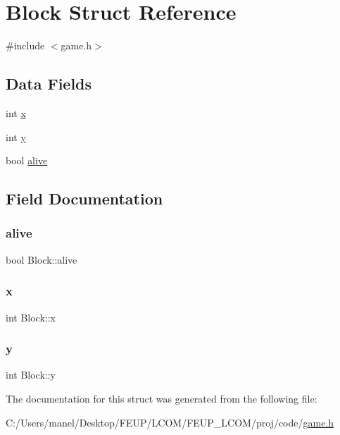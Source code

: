 \hypertarget{struct_block}{}\section{Block Struct Reference}
\label{struct_block}


{\ttfamily \#include $<$game.\+h$>$}

\subsection*{Data Fields}
\begin{DoxyCompactItemize}
\item 
int \mbox{\hyperlink{struct_block_a13d0a6d225233353862fa5adcbadf661}{x}}
\item 
int \mbox{\hyperlink{struct_block_a9328d6b6fcc9f9c019d091d87ceda41c}{y}}
\item 
bool \mbox{\hyperlink{struct_block_ace17e5300d4d90b70136387c91a830c5}{alive}}
\end{DoxyCompactItemize}


\subsection{Field Documentation}
\mbox{\label{struct_block_ace17e5300d4d90b70136387c91a830c5}} 
\subsubsection{\texorpdfstring{alive}{alive}}
{\footnotesize\ttfamily bool Block\+::alive}

\mbox{\label{struct_block_a13d0a6d225233353862fa5adcbadf661}} 
\subsubsection{\texorpdfstring{x}{x}}
{\footnotesize\ttfamily int Block\+::x}

\mbox{\label{struct_block_a9328d6b6fcc9f9c019d091d87ceda41c}} 
\subsubsection{\texorpdfstring{y}{y}}
{\footnotesize\ttfamily int Block\+::y}



The documentation for this struct was generated from the following file\+:\begin{DoxyCompactItemize}
\item 
C\+:/\+Users/manel/\+Desktop/\+F\+E\+U\+P/\+L\+C\+O\+M/\+F\+E\+U\+P\+\_\+\+L\+C\+O\+M/proj/code/\mbox{\hyperlink{game_8h}{game.\+h}}\end{DoxyCompactItemize}
